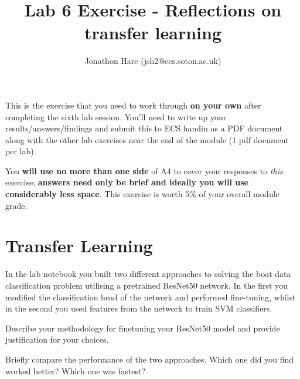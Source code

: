 \documentclass[a4paper]{article}
\begin{document}
\lstset{language=Python,upquote=true}

\setlength{\leftskip}{20pt}
\title{Lab 6 Exercise - Reflections on transfer learning}
\author{Jonathon Hare (jsh2@ecs.soton.ac.uk)}

\maketitle


This is the exercise that you need to work through \textbf{on your own} after completing the sixth lab session. You'll need to write up your results/answers/findings and submit this to ECS handin as a PDF document along with the other lab exercises near the end of the module (1 pdf document per lab). 

You \textbf{will use no more than one side} of A4 to cover your responses to \emph{this} exercise; \textbf{answers need only be brief and ideally you will use considerably less space}. This exercise is worth 5\% of your overall module grade.

\section{Transfer Learning}
In the lab notebook you built two different approaches to solving the boat data classification problem utilising a pretrained ResNet50 network. In the first you modified the classification head of the network and performed fine-tuning, whilst in the second you used features from the network to train SVM classifiers.
\\[1em]
\begin{tcolorbox}[title=Finetuning (2 marks)]
Describe your methodology for finetuning your ResNet50 model and provide justification for your choices.
\end{tcolorbox}
\vspace{1em}
\begin{tcolorbox}[title=Reflect on the two different approaches (3 marks)]
Briefly compare the performance of the two approaches. Which one did you find worked better? Which one was fastest? 
\end{tcolorbox}
\end{document}
